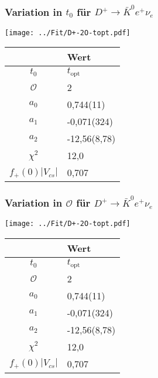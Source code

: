 \documentclass[hyperref={pdfpagelabels=false}]{beamer}
\begin{document}
\begin{frame}
 \frametitle{Variation in $t_0$ für $D^+\rightarrow \bar K^0 e^+ \nu_e$}
 \begin{minipage}[h]{0.66\textwidth}
  \texttt{[image: ../Fit/D+-2O-topt.pdf]}
 \end{minipage}
 \begin{minipage}[h]{0.32\textwidth}
  \begin{table}[h]
   \begin{tabular}{c|l}
   \toprule
     & Wert\\
    \midrule
    $t_0$ & $t_\text{opt}$\\
    $\mathcal{O}$ & 2\\
    \midrule
    $a_0$ & 0,744(11)\\
    $a_1$ & -0,071(324)\\
    $a_2$ & -12,56(8,78)\\
    \midrule
    $\chi^2$ & 12,0\\
    $f_+(0)|V_{cs}|$ & 0,707\\
    \bottomrule\bottomrule
   \end{tabular}

  \end{table}

 \end{minipage}
\end{frame}


\begin{frame}
 \frametitle{Variation in $\mathcal{O}$ für $D^+\rightarrow \bar K^0 e^+ \nu_e$}
  \begin{minipage}[h]{0.66\textwidth}
  \texttt{[image: ../Fit/D+-2O-topt.pdf]}
 \end{minipage}
 \begin{minipage}[h]{0.32\textwidth}
  \begin{table}[h]
   \begin{tabular}{c|l}
   \toprule
     & Wert\\
    \midrule
    $t_0$ & $t_\text{opt}$\\
    $\mathcal{O}$ & 2\\
    \midrule
    $a_0$ & 0,744(11)\\
    $a_1$ & -0,071(324)\\
    $a_2$ & -12,56(8,78)\\
    \midrule
    $\chi^2$ & 12,0\\
    $f_+(0)|V_{cs}|$ & 0,707\\
    \bottomrule\bottomrule
   \end{tabular}

  \end{table}

 \end{minipage}
\end{frame}
\end{document}
